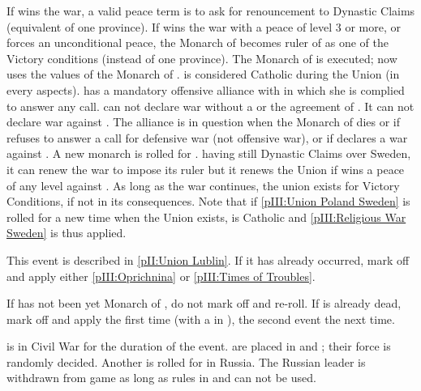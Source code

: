 \phpaix
\aparag If \SUE wins the war, a valid peace term is to ask for renouncement to
Dynastic Claims (equivalent of one province).
\aparag If \POL wins the war with a peace of level 3 or more, or forces an
unconditional peace, the Monarch of \POL becomes ruler of \SUE as one of the
Victory conditions (instead of one province).
\bparag The Monarch of \SUE is executed; now \SUE uses the values of the
Monarch of \POL. \SUE is considered Catholic during the Union (in every
aspects).
\bparag \SUE has a mandatory offensive alliance with \POL in which she is
complied to answer any call.
\bparag \SUE can not declare war without a \CB or the agreement of \POL.  It
can not declare war against \POL.
\bparag The alliance is in question when the Monarch of \POL dies or if \POL
refuses to answer a call for defensive war (not offensive war), or if \POL
declares a war against \SUE.  A new monarch is rolled for \SUE. \POL having
still Dynastic Claims over Sweden, it can renew the war to impose its ruler
but it renews the Union if \POL wins a peace of any level against \SUE. As
long as the war continues, the union exists for Victory Conditions, if not in
its consequences.
\bparag Note that if \ref{pIII:Union Poland Sweden} is rolled for a new time
when the Union exists, \SUE is Catholic and \ref{pIII:Religious War Sweden} is
thus applied.





\condition{}
\aparag This event is described in \ref{pII:Union Lublin}.
\aparag If it has already occurred, mark off and apply either
\ref{pIII:Oprichnina} or \ref{pIII:Times of Troubles}.





\condition{}
\aparag If  has not been yet Monarch of \RUS, do not mark
off and re-roll.
\aparag If  is already dead, mark off and apply \RD the
first time (with a \REVOLT in \RUS), the second event the next time.

\phevnt
\aparag \RUS is in Civil War for the duration of the event.
\aparag \REVOLT are placed in \provinceMoscou and \provinceNovgorod; their
force is randomly decided.
\aparag Another \REVOLT is rolled for in Russia.
\aparag The Russian leader \leaderKurbsky is withdrawn from game as long as
 rules in \RUS and can not be used.

